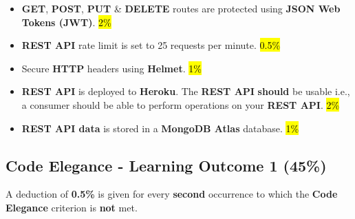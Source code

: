 \documentclass{article}
\begin{document}
\begin{itemize}
  \item \textbf{GET}, \textbf{POST}, \textbf{PUT} \& \textbf{DELETE} routes are protected using \textbf{JSON Web Tokens (JWT)}. \hl{2\%}
  \item \textbf{REST API} rate limit is set to 25 requests per minute. \hl{0.5\%}
  \item Secure \textbf{HTTP} headers using \textbf{Helmet}. \hl{1\%}
  \item \textbf{REST API} is deployed to \textbf{Heroku}. The \textbf{REST API} \textbf{should} be usable i.e., a consumer should be able to perform operations on your \textbf{REST API}. \hl{2\%}
  \item \textbf{REST API data} is stored in a \textbf{MongoDB Atlas} database. \hl{1\%}
\end{itemize}

\subsection*{Code Elegance - Learning Outcome 1 (45\%)}

A deduction of \textbf{0.5\%} is given for every \textbf{second} occurrence to which the \textbf{Code Elegance} criterion is \textbf{not} met.
\end{document}

